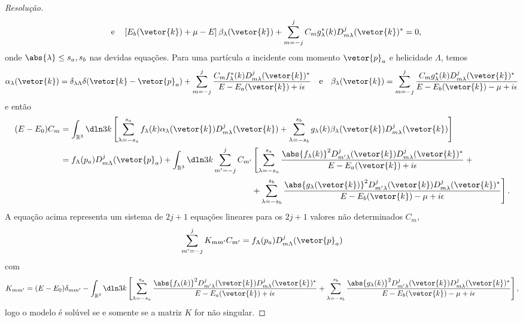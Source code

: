 \begin{proof}[Resolução]
\begin{equation*}
      \quad\text{e}\quad
      \left[E_b(\vetor{k}) + \mu - E\right]\beta_{\lambda}(\vetor{k}) + \sum_{m = -j}^j C_m g^*_\lambda(k) D^j_{m\lambda}(\vetor{k})^* = 0,
   \end{equation*}
   onde \(\abs{\lambda} \leq s_a, s_b\) nas devidas equações. Para uma partícula \(a\) incidente com momento \(\vetor{p}_a\) e helicidade \(\Lambda\), temos
   \begin{equation*}
      \alpha_{\lambda}(\vetor{k}) = \delta_{\lambda \Lambda} \delta(\vetor{k} - \vetor{p}_a) + \sum_{m = - j}^{j} \frac{C_m f_\lambda^*(k) D_{m\lambda}^j(\vetor{k})^*}{E - E_a(\vetor{k}) + i\epsilon}
      \quad\text{e}\quad
      \beta_{\lambda}(\vetor{k}) = \sum_{m = - j}^{j} \frac{C_m g_\lambda^*(k) D_{m\lambda}^j(\vetor{k})^*}{E - E_b(\vetor{k}) - \mu + i\epsilon}
   \end{equation*}
   e então
   \begin{align*}
      (E - E_0)C_{m} &= \int_{\mathbb{R}^3} \dln3{k} \left[\sum_{\lambda = -s_a}^{s_a} f_\lambda(k) \alpha_{\lambda}(\vetor{k}) D^{j}_{m\lambda}(\vetor{k}) + \sum_{\lambda = -s_b}^{s_b} g_{\lambda}(k) \beta_\lambda(\vetor{k}) D^j_{m \lambda}(\vetor{k})\right]\\
                     &= f_{\Lambda}(p_a) D^j_{m \Lambda}(\vetor{p}_a) + \int_{\mathbb{R}^3} \dln3k \sum_{m' = -j}^{j}C_{m'}\left[\sum_{\lambda = -s_a}^{s_a} \frac{\abs{f_\lambda(k)}^2 D^j_{m' \lambda}(\vetor{k}) D^{j}_{m \lambda}(\vetor{k})^*}{E - E_a(\vetor{k}) + i \epsilon}  +{} \right.\\
                     &{}\phantom{f_{\Lambda}(p_a) D^j_{m \Lambda}(\vetor{p}_a) + \int_{\mathbb{R}^3} \dln3k \sum_{m' = -j}^{j}C_{m'} + {}}\left.+ \sum_{\lambda = -s_b}^{s_b}\frac{\abs{g_\lambda(\vetor{k})}^2D^j_{m' \lambda}(\vetor{k}) D^{j}_{m \lambda}(\vetor{k})^*}{E - E_b(\vetor{k}) - \mu + i\epsilon}\right].
   \end{align*}
   A equação acima representa um sistema de \(2j + 1\) equações lineares para os \(2j + 1\) valores não determinados \(C_{m},\) 
   \begin{equation*}
      \sum_{m' = -j}^{j} K_{mm'} C_{m'} = f_\Lambda(p_a) D^j_{m \Lambda}(\vetor{p}_a)
   \end{equation*}
   com 
   \begin{equation*}
      K_{mm'} = (E - E_0) \delta_{mm'} - \int_{\mathbb{R}^3}\dln3k \left[\sum_{\lambda = -s_a}^{s_a} \frac{\abs{f_\lambda(k)}^2 D^{j}_{m'\lambda}(\vetor{k}) D^j_{m \lambda}(\vetor{k})^*}{E - E_a(\vetor{k}) + i \epsilon} + \sum_{\lambda = -s_b}^{s_b} \frac{\abs{g_\lambda(k)}^2 D^{j}_{m'\lambda}(\vetor{k}) D^j_{m \lambda}(\vetor{k})^*}{E - E_b(\vetor{k}) - \mu + i \epsilon}\right],
   \end{equation*}
   logo o modelo é solúvel se e somente se a matriz \(K\) for não singular.

\end{proof}
